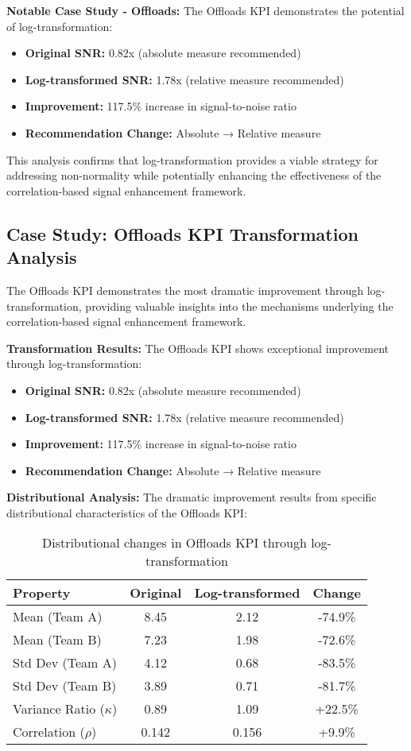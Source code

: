 \textbf{Notable Case Study - Offloads:}
The Offloads KPI demonstrates the potential of log-transformation:
\begin{itemize}
    \item \textbf{Original SNR:} 0.82x (absolute measure recommended)
    \item \textbf{Log-transformed SNR:} 1.78x (relative measure recommended)
    \item \textbf{Improvement:} 117.5\% increase in signal-to-noise ratio
    \item \textbf{Recommendation Change:} Absolute → Relative measure
\end{itemize}

This analysis confirms that log-transformation provides a viable strategy for addressing non-normality while potentially enhancing the effectiveness of the correlation-based signal enhancement framework.

\subsection{Case Study: Offloads KPI Transformation Analysis}

The Offloads KPI demonstrates the most dramatic improvement through log-transformation, providing valuable insights into the mechanisms underlying the correlation-based signal enhancement framework.

\textbf{Transformation Results:}
The Offloads KPI shows exceptional improvement through log-transformation:
\begin{itemize}
    \item \textbf{Original SNR:} 0.82x (absolute measure recommended)
    \item \textbf{Log-transformed SNR:} 1.78x (relative measure recommended)
    \item \textbf{Improvement:} 117.5\% increase in signal-to-noise ratio
    \item \textbf{Recommendation Change:} Absolute → Relative measure
\end{itemize}

\textbf{Distributional Analysis:}
The dramatic improvement results from specific distributional characteristics of the Offloads KPI:

\begin{table}[h]
\centering
\begin{tabular}{|l|c|c|c|}
\hline
\textbf{Property} & \textbf{Original} & \textbf{Log-transformed} & \textbf{Change} \\
\hline
Mean (Team A) & 8.45 & 2.12 & -74.9\% \\
Mean (Team B) & 7.23 & 1.98 & -72.6\% \\
Std Dev (Team A) & 4.12 & 0.68 & -83.5\% \\
Std Dev (Team B) & 3.89 & 0.71 & -81.7\% \\
Variance Ratio ($\kappa$) & 0.89 & 1.09 & +22.5\% \\
Correlation ($\rho$) & 0.142 & 0.156 & +9.9\% \\
\hline
\end{tabular}
\caption{Distributional changes in Offloads KPI through log-transformation}
\label{tab:offloads_transformation}
\end{table}

